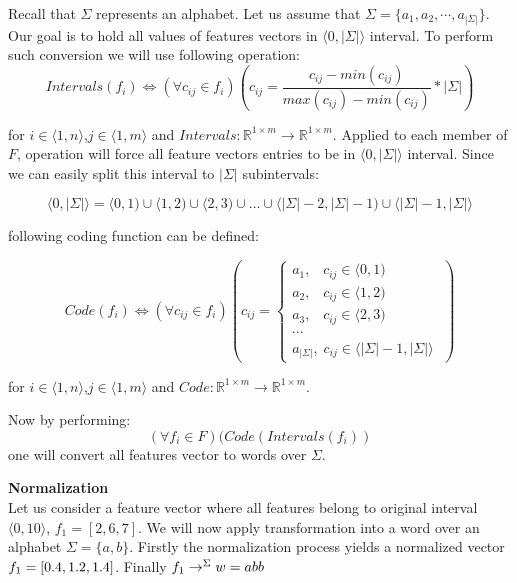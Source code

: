 \documentclass{mini}
\begin{document}
Recall that $\Sigma$ represents an alphabet. Let us assume that $\Sigma = \{a_1 , a_2, \cdots, a_{|\Sigma|}\}$. Our goal is to hold all values of features vectors in $\langle 0 , |\Sigma| \rangle$ interval. To perform such conversion we will use following operation:
\begin{equation}
Intervals(f_i) \Leftrightarrow (\forall{c_{ij} \in f_i})(c_{ij} =  \frac{c_{ij} - min(c_{ij})}{max(c_{ij}) - min(c_{ij})} * |\Sigma|)
\end{equation}

for $i \in \langle 1, n \rangle$,$j \in \langle 1, m \rangle$ and $Intervals : \mathbb{R}^{1 \times m} \rightarrow \mathbb{R}^{1 \times m}$. Applied to each member of $F$, operation will force all feature vectors entries to be in $\langle 0 , |\Sigma| \rangle$ interval. Since we can easily split this interval to $|\Sigma|$ subintervals:

\[
\langle 0 , |\Sigma| \rangle = \langle 0 , 1) \cup \langle 1 , 2 ) \cup \langle 2 , 3 ) \cup \ldots \cup \langle |\Sigma| -2 , |\Sigma| -1 ) \cup \langle |\Sigma| -1, |\Sigma|  \rangle
\] 

following coding function can be defined:

\begin{equation}
Code(f_i) \Leftrightarrow (\forall{c_{ij} \in f_i})(c_{ij} = 
\begin{cases}
a_1 , \;\;\; c_{ij} \in  \langle 0 , 1)  \\
a_2 , \;\;\; c_{ij} \in  \langle 1 , 2 ) \\
a_3 , \;\;\; c_{ij} \in  \langle 2 , 3 )\\
\cdots \\
a_{|\Sigma|} , \; c_{ij} \in \langle |\Sigma| -1, |\Sigma|  \rangle\; 
\end{cases})
\end{equation}

for $i \in \langle 1, n \rangle$,$j \in \langle 1, m \rangle$ and $Code : \mathbb{R}^{1 \times m} \rightarrow \mathbb{R}^{1 \times m}$.

Now by performing:
\begin{equation}
(\forall{f_i \in F})(Code(Intervals(f_i))
\end{equation}
one will convert all features vector to words over $\Sigma$.

\begin{example} {\bf Normalization}\\
    Let us consider a feature vector where all features belong to original interval $\langle 0, 10 \rangle$, $f_1=[2, 6, 7]$. We will now apply transformation into a word over an alphabet $\Sigma=\{a,b\}$. Firstly the normalization process yields a normalized vector $f_1=[0.4, 1.2, 1.4]$. Finally $f_1 \rightarrow^{\Sigma}w=abb$
\end{example}
\end{document}
